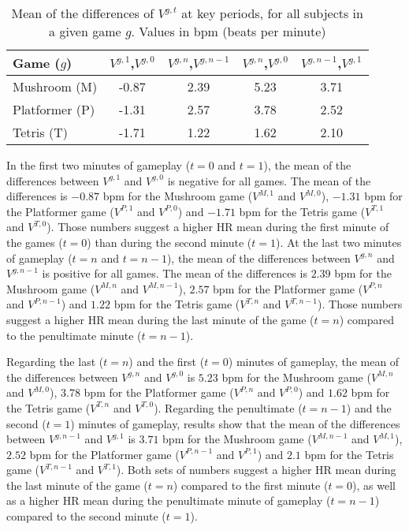 \begin{table}
\caption{Mean of the differences of $V^{g,t}$ at key periods, for all subjects in a given game $g$. Values in bpm (beats per minute)}
\label{table:mean}
\centering
\begin{tabular}{p{.21\linewidth}cccc}
\toprule%
\textbf{Game ($g$)} & \textbf{$V^{g,1}$,$V^{g,0}$} & \textbf{$V^{g,n}$,$V^{g,n-1}$} & \textbf{$V^{g,n}$,$V^{g,0}$} & \textbf{$V^{g,n-1}$,$V^{g,1}$} \\
\toprule%
Mushroom (M) & -0.87   & 2.39 & 5.23 & 3.71 \\
\midrule%
Platformer (P) & -1.31   & 2.57 & 3.78  & 2.52  \\
\midrule%
Tetris (T) & -1.71 & 1.22  & 1.62    & 2.10 \\
\bottomrule%
\end{tabular}
\end{table}

In the first two minutes of gameplay ($t=0$ and $t=1$), the mean of the differences between $V^{g,1}$ and $V^{g,0}$ is negative for all games. The mean of the differences is $-0.87$ bpm for the Mushroom game ($V^{M,1}$ and $V^{M,0}$), $-1.31$ bpm for the Platformer game ($V^{P,1}$ and $V^{P,0}$) and $-1.71$ bpm for the Tetris game ($V^{T,1}$ and $V^{T,0}$). Those numbers suggest a higher HR mean during the first minute of the games ($t=0$) than during the second minute ($t=1$). At the last two minutes of gameplay ($t=n$ and $t=n-1$), the mean of the differences between $V^{g,n}$ and $V^{g,n-1}$ is positive for all games. The mean of the differences is $2.39$ bpm for the Mushroom game ($V^{M,n}$ and $V^{M,n-1}$), $2.57$ bpm for the Platformer game ($V^{P,n}$ and $V^{P,n-1}$) and $1.22$ bpm for the Tetris game ($V^{T,n}$ and $V^{T,n-1}$). Those numbers suggest a higher HR mean during the last minute of the game ($t=n$) compared to the penultimate minute ($t=n-1$).

Regarding the last ($t=n$) and the first ($t=0$) minutes of gameplay, the mean of the differences between $V^{g,n}$ and $V^{g,0}$ is $5.23$ bpm for the Mushroom game ($V^{M,n}$ and $V^{M,0}$), $3.78$ bpm for the Platformer game ($V^{P,n}$ and $V^{P,0}$) and $1.62$ bpm for the Tetris game ($V^{T,n}$ and $V^{T,0}$). Regarding the penultimate ($t=n-1$) and the second ($t=1$) minutes of gameplay, results show that the mean of the differences between $V^{g,n-1}$ and $V^{g,1}$ is $3.71$ bpm for the Mushroom game ($V^{M,n-1}$ and $V^{M,1}$), $2.52$ bpm for the Platformer game ($V^{P,n-1}$ and $V^{P,1}$) and $2.1$ bpm for the Tetris game ($V^{T,n-1}$ and $V^{T,1}$). Both sets of numbers suggest a higher HR mean during the last minute of the game ($t=n$) compared to the first minute ($t=0$), as well as a higher HR mean during the penultimate minute of gameplay ($t=n-1$) compared to the second minute ($t=1$).

